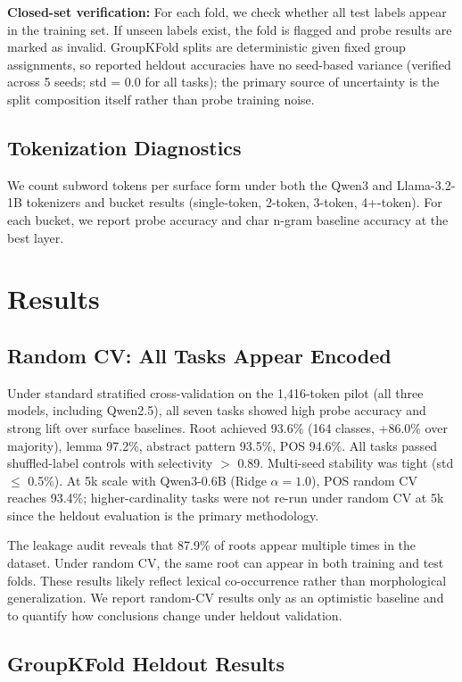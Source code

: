 \documentclass[11pt,a4paper]{article}
\begin{document}
\textbf{Closed-set verification:} For each fold, we check whether all test labels appear in the training set. If unseen labels exist, the fold is flagged and probe results are marked as invalid. GroupKFold splits are deterministic given fixed group assignments, so reported heldout accuracies have no seed-based variance (verified across 5 seeds; std = 0.0 for all tasks); the primary source of uncertainty is the split composition itself rather than probe training noise.

\subsection{Tokenization Diagnostics}
We count subword tokens per surface form under both the Qwen3 and Llama-3.2-1B tokenizers and bucket results (single-token, 2-token, 3-token, 4+-token). For each bucket, we report probe accuracy and char n-gram baseline accuracy at the best layer.

\section{Results}\label{sec:results}

\subsection{Random CV: All Tasks Appear Encoded}
Under standard stratified cross-validation on the 1,416-token pilot (all three models, including Qwen2.5), all seven tasks showed high probe accuracy and strong lift over surface baselines. Root achieved 93.6\% (164 classes, +86.0\% over majority), lemma 97.2\%, abstract pattern 93.5\%, POS 94.6\%. All tasks passed shuffled-label controls with selectivity $>$ 0.89. Multi-seed stability was tight (std $\leq$ 0.5\%). At 5k scale with Qwen3-0.6B (Ridge $\alpha=1.0$), POS random CV reaches 93.4\%; higher-cardinality tasks were not re-run under random CV at 5k since the heldout evaluation is the primary methodology.

The leakage audit reveals that 87.9\% of roots appear multiple times in the dataset. Under random CV, the same root can appear in both training and test folds. These results likely reflect lexical co-occurrence rather than morphological generalization. We report random-CV results only as an optimistic baseline and to quantify how conclusions change under heldout validation.

\subsection{GroupKFold Heldout Results}
\end{document}
